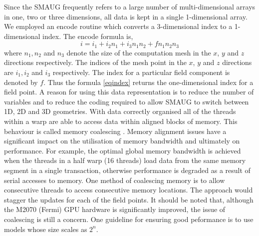 \documentclass[final,1p]{elsarticle}
\begin{document}
Since the SMAUG frequently refers to a large number of multi-dimensional arrays in one, two or three dimensions, all data is kept in a single 1-dimensional array. We employed an encode routine which converts a 3-dimensional index to a 1-dimensional index. The encode formula is,
\begin{equation}\label{eqindex}
i=i_{1}+i_{2}n_{1}+i_{3}n_{1}n_{2}+f n_{1} n_{2} n_{3}
\end{equation}
where $n_{1},n_{2}$ and $n_{3}$  denote the size of the computation mesh in the $x$, $y$ and $z$ directions respectively. The indices of the mesh point in the  $x$, $y$ and $z$ directions are $i_{1}, i_{2}$ and $i_{3}$ respectively. The index for a particular field component is denoted by  ${f}$. Thus the formula \eqref{eqindex} returns the one-dimensional index for a field point.  A reason for using this data representation is to reduce the number of variables and to reduce the coding required to allow SMAUG to switch between 1D,  2D and 3D geometries.
 With data correctly organised all of the threads within a warp are able to access data within aligned blocks of memory. This behaviour is called memory coalescing \cite{Farber2011}. Memory alignment issues have a significant impact on the utilisation of memory bandwidth and ultimately on performance. For example, the optimal global memory bandwidth is achieved when the threads in a half warp (16 threads) load data from the same memory segment in a single transaction, otherwise performance is degraded as a result of serial accesses to memory. One method of coalescing memory is to allow consecutive threads to access consecutive memory locations. The approach would stagger the updates for each of the field points. It should be noted that, although the M2070 (Fermi) GPU hardware is significantly improved, the issue of coalescing is still a concern. One guideline for ensuring good peformance is to use models whose size scales  as $2^{n}$.



\end{document}
